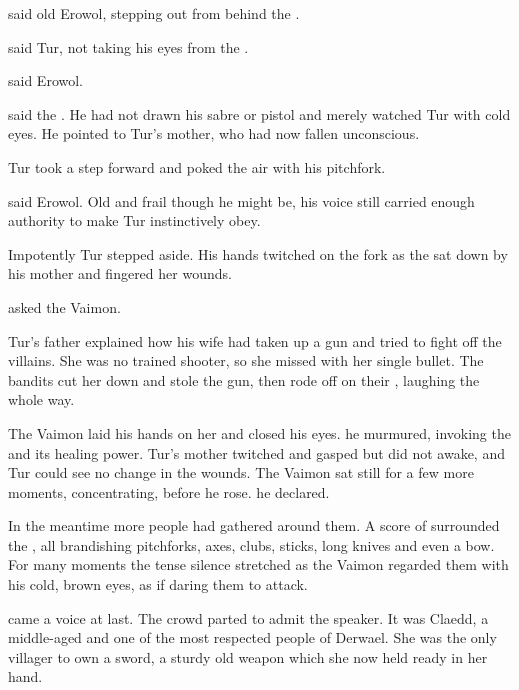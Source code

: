  said old Erowol, stepping out from behind the \human.

 said Tur, not taking his eyes from the \human. 

 said Erowol.



 said the \human.
He had not drawn his sabre or pistol and merely watched Tur with cold eyes.
He pointed to Tur's mother, who had now fallen unconscious. 

Tur took a step forward and poked the air with his pitchfork. 

 said Erowol. 
Old and frail though he might be, his voice still carried enough authority to make Tur instinctively obey. 

Impotently Tur stepped aside. 
His hands twitched on the fork as the \human sat down by his mother and fingered her wounds. 

 asked the Vaimon. 

Tur's father explained how his wife had taken up a gun and tried to fight off the villains. 
She was no trained shooter, so she missed with her single bullet. 
The bandits cut her down and stole the gun, then rode off on their \relcs, laughing the whole way. 

The Vaimon laid his hands on her and closed his eyes. 
\ta{\Ishiel,} he murmured, invoking the \sephirah and its healing power. 
Tur's mother twitched and gasped but did not awake, and Tur could see no change in the wounds. 
The Vaimon sat still for a few more moments, concentrating, before he rose. 
 he declared. 

In the meantime more people had gathered around them.
A score of \scathae surrounded the \human, all brandishing pitchforks, axes, clubs, sticks, long knives and even a bow. 
For many moments the tense silence stretched as the Vaimon regarded them with his cold, brown eyes, as if daring them to attack. 

 came a voice at last. 
The crowd parted to admit the speaker. 
It was Claedd, a middle-aged \sphyle and one of the most respected people of Derwael. 
She was the only villager to own a sword, a sturdy old weapon which she now held ready in her hand. 

